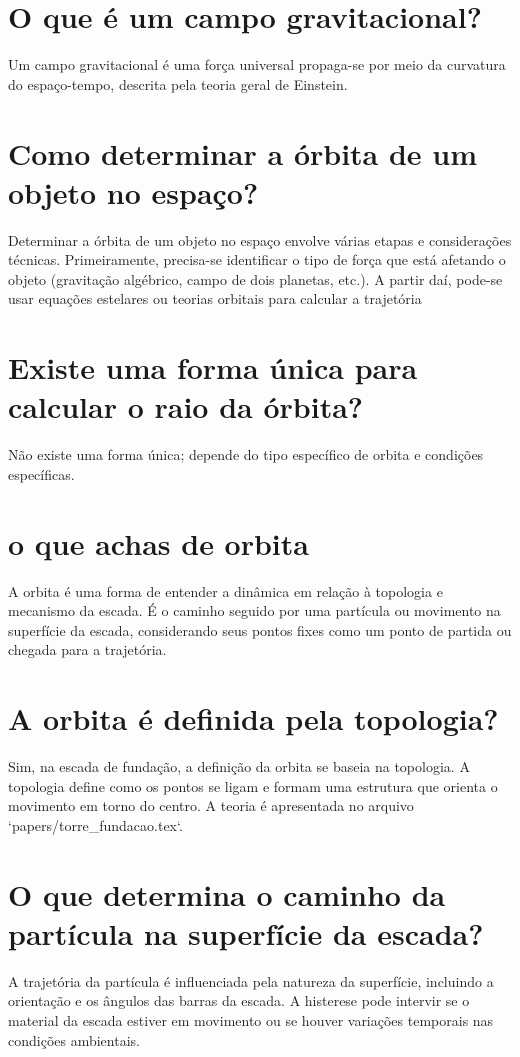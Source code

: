 \documentclass[11pt,a4paper]{article}
\begin{document}
\section{O que é um campo gravitacional?}
Um campo gravitacional é uma força universal propaga-se por meio da curvatura do espaço-tempo, descrita pela teoria geral de Einstein.

\section{Como determinar a órbita de um objeto no espaço?}
Determinar a órbita de um objeto no espaço envolve várias etapas e considerações técnicas. Primeiramente, precisa-se identificar o tipo de força que está afetando o objeto (gravitação algébrico, campo de dois planetas, etc.). A partir daí, pode-se usar equações estelares ou teorias orbitais para calcular a trajetória

\section{Existe uma forma única para calcular o raio da órbita?}
Não existe uma forma única; depende do tipo específico de orbita e condições específicas.

\section{o que achas de orbita}
A orbita é uma forma de entender a dinâmica em relação à topologia e mecanismo da escada. É o caminho seguido por uma partícula ou movimento na superfície da escada, considerando seus pontos fixes como um ponto de partida ou chegada para a trajetória.

\section{A orbita é definida pela topologia?}
Sim, na escada de fundação, a definição da orbita se baseia na topologia. A topologia define como os pontos se ligam e formam uma estrutura que orienta o movimento em torno do centro. A teoria é apresentada no arquivo `papers/torre\_fundacao.tex`.

\section{O que determina o caminho da partícula na superfície da escada?}
A trajetória da partícula é influenciada pela natureza da superfície, incluindo a orientação e os ângulos das barras da escada. A histerese pode intervir se o material da escada estiver em movimento ou se houver variações temporais nas condições ambientais.
\end{document}
